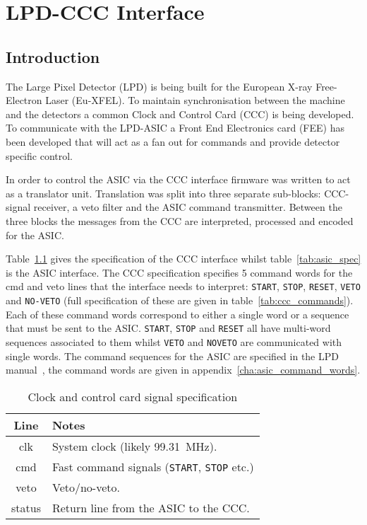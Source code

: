     \part{LPD-CCC Interface} %
    \label{prt:lpd_ccc_interface}
    \chapter{Introduction} %
    \label{cha:lpd_ccc_introduction}
    The Large Pixel Detector (LPD) is being built for the European X-ray Free-Electron Laser (Eu-XFEL). To maintain synchronisation between the machine and the detectors a common Clock and Control Card (CCC) is being developed. To communicate with the LPD-ASIC a Front End Electronics card (FEE) has been developed that will act as a fan out for commands and provide detector specific control.
    
    In order to control the ASIC via the CCC interface firmware was written to act as a translator unit. Translation was split into three separate sub-blocks: CCC-signal receiver, a veto filter and the ASIC command transmitter. Between the three blocks the messages from the CCC are interpreted, processed and encoded for the ASIC. 
    
    Table~\ref{tab:ccc_spec} gives the specification of the CCC interface whilst table~\ref{tab:asic_spec} is the ASIC interface. The CCC specification specifies 5 command words for the cmd and veto lines that the interface needs to interpret: \texttt{START}, \texttt{STOP}, \texttt{RESET}, \texttt{VETO} and \texttt{NO-VETO} (full specification of these are given in table~\ref{tab:ccc_commands}). Each of these command words correspond to either a single word or a sequence that must be sent to the ASIC. \texttt{START}, \texttt{STOP} and \texttt{RESET} all have multi-word sequences associated to them whilst \texttt{VETO} and \texttt{NOVETO} are communicated with single words. The command sequences for the ASIC are specified in the LPD manual~\cite{lpd_manual}, the command words are given in appendix~\ref{cha:asic_command_words}.
    
    \begin{table}
        \begin{center}
            \begin{tabular}{c|l}
                Line & Notes \\
                \hline
                clk    & System clock (likely 99.31~MHz).        \\
                cmd    & Fast command signals (\texttt{START}, \texttt{STOP} etc.) \\
                veto   & Veto/no-veto.                                             \\
                status & Return line from the ASIC to the CCC.                     \\
            \end{tabular}
        \end{center}
        \caption{Clock and control card signal specification}
        \label{tab:ccc_spec}
    \end{table}

